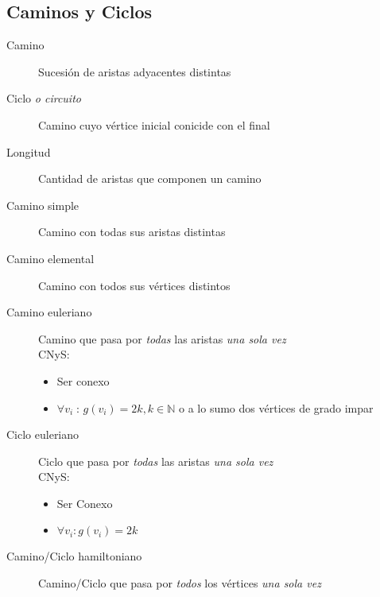 \documentclass[a4paper,twocolumn]{article}
\numberwithin{equation}{section}
\numberwithin{figure}{section}
\numberwithin{table}{section}
\newcommand{\refa}[1]{}
\newcommand{\talque}{\;:\,} %
\begin{document}
\subsection{Caminos y Ciclos}
\begin{description}
	\item[Camino]\label{camino} Sucesi\'on de aristas adyacentes\refa{adyacente} distintas
    \item[Ciclo \emph{o circuito}]\label{ciclo} Camino\refa{camino} cuyo v\'ertice inicial conicide con el final
    \item[Longitud] Cantidad de aristas que componen un camino\refa{camino}
    \item[Camino simple]\label{camino simple} Camino\refa{camino} con todas sus aristas distintas
   \item[Camino elemental] Camino\refa{camino} con todos sus v\'ertices distintos
   \item[Camino euleriano] Camino\refa{camino} que pasa por \emph{todas} las aristas \emph{una sola vez}
    	\\ CNyS:
        	\begin{itemize}
            	\item Ser conexo\refa{conexo}
                \item $\forall v_i \talque g(v_i) = 2k, k \in \mathbb{N}$ o a lo sumo dos v\'ertices de grado\refa{grado} impar
            \end{itemize}
   \item[Ciclo euleriano] Ciclo\refa{ciclo} que pasa por \emph{todas} las aristas \emph{una sola vez}
        	\\ CNyS:
        	\begin{itemize}
            	\item Ser Conexo\refa{conexo}
                \item $\forall v_i : g(v_i) = 2k$
            \end{itemize}
	\item[Camino/Ciclo hamiltoniano] Camino\refa{camino}/Ciclo\refa{ciclo} que pasa por \emph{todos} los v\'ertices \emph{una sola vez}   
\end{description}
\end{document}
